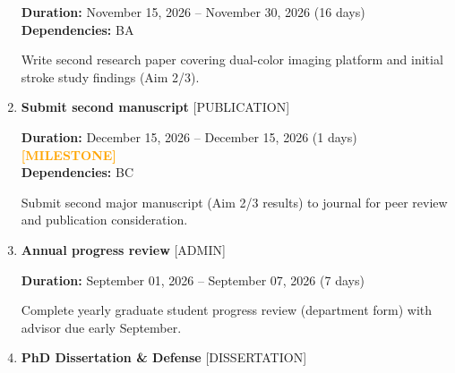 \documentclass[landscape,a4paper]{article}
\begin{document}
\begin{enumerate}[leftmargin=1.5cm, itemsep=1em, parsep=0.5em]
          \vspace{0.2em}
          \textcolor{black!70}{\textbf{Duration:} November 15, 2026 -- November 30, 2026 (16 days)}
          \\[0.2em]\textcolor{black!70}{\textbf{Dependencies:} BA}\n
          \vspace{0.4em}
          \begin{minipage}[t]{0.9\textwidth}
          \textcolor{black!85}{Write second research paper covering dual-color imaging platform and initial stroke study findings (Aim 2/3).}
          \end{minipage}

    \item \textcolor{researchout}{\textbf{\large Submit second manuscript}}
          \hfill \textcolor{black!60}{\small [PUBLICATION]}
          
          \vspace{0.2em}
          \textcolor{black!70}{\textbf{Duration:} December 15, 2026 -- December 15, 2026 (1 days)}
          \textcolor{orange}{\textbf{ [MILESTONE]}}\n          \\[0.2em]\textcolor{black!70}{\textbf{Dependencies:} BC}\n
          \vspace{0.4em}
          \begin{minipage}[t]{0.9\textwidth}
          \textcolor{black!85}{Submit second major manuscript (Aim 2/3 results) to journal for peer review and publication consideration.}
          \end{minipage}

    \item \textcolor{other}{\textbf{\large Annual progress review}}
          \hfill \textcolor{black!60}{\small [ADMIN]}
          
          \vspace{0.2em}
          \textcolor{black!70}{\textbf{Duration:} September 01, 2026 -- September 07, 2026 (7 days)}

          \vspace{0.4em}
          \begin{minipage}[t]{0.9\textwidth}
          \textcolor{black!85}{Complete yearly graduate student progress review (department form) with advisor due early September.}
          \end{minipage}

    \item \textcolor{other}{\textbf{\large PhD Dissertation \& Defense}}
          \hfill \textcolor{black!60}{\small [DISSERTATION]}
          

\end{enumerate}
\end{document}
